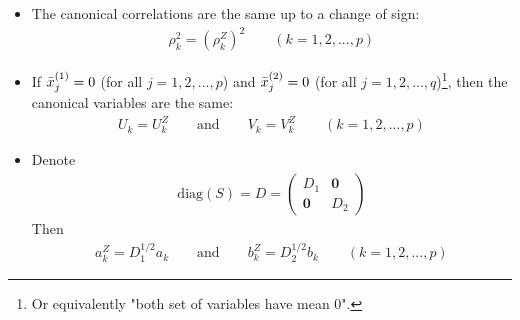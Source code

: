 \documentclass[12pt]{extarticle}
\newcommand{\<}{\langle}
\renewcommand{\>}{\rangle}
\theoremstyle{definition}
\begin{document}
\begin{tcolorbox}[enhanced, drop fuzzy shadow, title=Result 10.3]
\begin{itemize}
    \item The canonical correlations are the same up to a change of sign:
    \begin{align*}
        \rho^2_k = (\rho^Z_k)^2 \qquad (k=1,2,...,p)
    \end{align*}
    \item If $\Bar{x}_j^{(1)}=0$ (for all $j=1,2,...,p$) and $\Bar{x}_j^{(2)}=0$ (for all $j=1,2,...,q$)\footnote{Or equivalently "both set of variables have mean 0".}, then the canonical variables are the same:
    \begin{align*}
        U_k =U_k^Z \qquad \text{and} \qquad V_k = V_k^Z \qquad (k=1,2,...,p)
    \end{align*}
    \item Denote
    \begin{align*}
        \text{diag}(S)=D= \left(\begin{array}{cc}
        D_1 & \textbf{0} \\
        \textbf{0} & D_2
        \end{array} \right)
    \end{align*}
    Then
    \begin{align*}
        a_k^Z = D_1^{1/2}a_k \qquad \text{and} \qquad b_k^Z = D_2^{1/2}b_k \qquad (k=1,2,...,p)
    \end{align*}
\end{itemize}
\end{tcolorbox}
\end{document}
